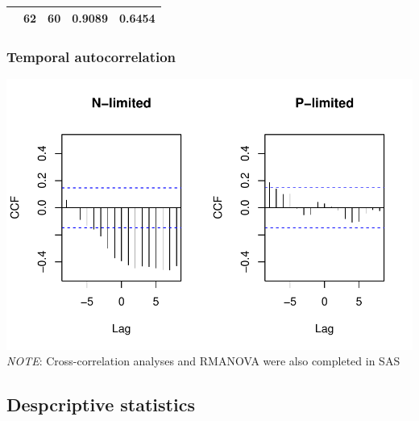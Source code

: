 \documentclass[]{article}
\begin{document}
\begin{longtable}[]{@{}ccccc@{}}
\begin{minipage}[t]{0.21\columnwidth}
\strut\end{minipage} &
\begin{minipage}[t]{0.10\columnwidth}\centering\strut
62
\strut\end{minipage} &
\begin{minipage}[t]{0.10\columnwidth}\centering\strut
60
\strut\end{minipage} &
\begin{minipage}[t]{0.12\columnwidth}\centering\strut
0.9089
\strut\end{minipage} &
\begin{minipage}[t]{0.12\columnwidth}\centering\strut
0.6454
\strut\end{minipage}\tabularnewline
\bottomrule
\end{longtable}

\newpage

\subsubsection{Temporal autocorrelation}\label{temporal-autocorrelation}

\includegraphics{analysis_ecoevostoich_files/figure-latex/unnamed-chunk-12-1.pdf}
\emph{NOTE}: Cross-correlation analyses and RMANOVA were also completed
in SAS

\newpage

\subsection{Despcriptive statistics}\label{despcriptive-statistics}
\end{document}
